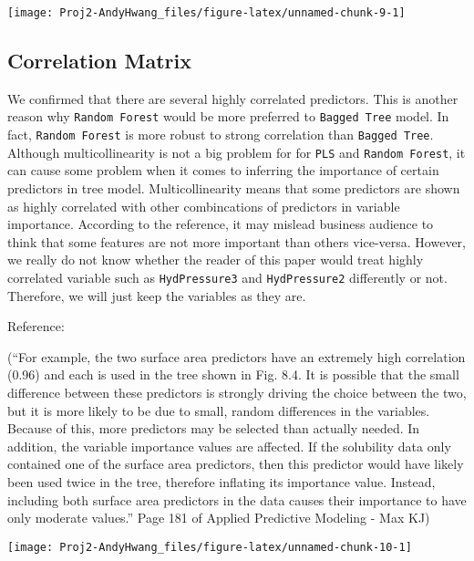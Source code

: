 \documentclass[]{report}
\begin{document}
\begin{center}\texttt{[image: Proj2-AndyHwang\_files/figure-latex/unnamed-chunk-9-1]} \end{center}

\subsection{Correlation Matrix}\label{correlation-matrix}

We confirmed that there are several highly correlated predictors. This
is another reason why \texttt{Random\ Forest} would be more preferred to
\texttt{Bagged\ Tree} model. In fact, \texttt{Random\ Forest} is more
robust to strong correlation than \texttt{Bagged\ Tree}. Although
multicollinearity is not a big problem for for \texttt{PLS} and
\texttt{Random\ Forest}, it can cause some problem when it comes to
inferring the importance of certain predictors in tree model.
Multicollinearity means that some predictors are shown as highly
correlated with other combincations of predictors in variable
importance. According to the reference, it may mislead business audience
to think that some features are not more important than others
vice-versa. However, we really do not know whether the reader of this
paper would treat highly correlated variable such as
\texttt{HydPressure3} and \texttt{HydPressure2} differently or not.
Therefore, we will just keep the variables as they are.

Reference:

(``For example, the two surface area predictors have an extremely high
correlation (0.96) and each is used in the tree shown in Fig. 8.4. It is
possible that the small difference between these predictors is strongly
driving the choice between the two, but it is more likely to be due to
small, random differences in the variables. Because of this, more
predictors may be selected than actually needed. In addition, the
variable importance values are affected. If the solubility data only
contained one of the surface area predictors, then this predictor would
have likely been used twice in the tree, therefore inflating its
importance value. Instead, including both surface area predictors in the
data causes their importance to have only moderate values.'' Page 181 of
Applied Predictive Modeling - Max KJ)

\begin{center}\texttt{[image: Proj2-AndyHwang\_files/figure-latex/unnamed-chunk-10-1]} \end{center}
\end{document}
